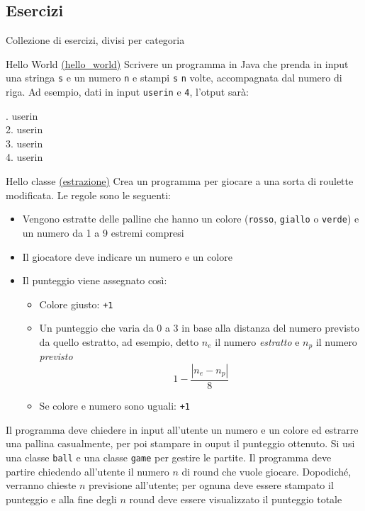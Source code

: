 \subsection{Esercizi}
Collezione di esercizi, divisi per categoria
\begin{esercizio}{Hello World \href{run:./files/java/esercizi/hello_world/}{(hello\_world)}}
	Scrivere un programma in Java che prenda in input una stringa \verb|s| e un numero \verb|n| e stampi \verb|s| \verb|n| volte, accompagnata dal numero di riga. Ad esempio, dati in input \verb|userin| e \verb|4|, l'otput sarà:
	\begin{center}
		. userin\\
		2. userin\\
		3. userin\\
		4. userin
	\end{center}
\end{esercizio}
\begin{esercizio}{Hello classe \href{run:./files/java/esercizi/estrazione/}{(estrazione)}}
	Crea un programma per giocare a una sorta di roulette modificata. Le regole sono le seguenti:
	\begin{itemize}
		\item Vengono estratte delle palline che hanno un colore (\verb|rosso|,  \verb|giallo| o \verb|verde|) e un numero da 1 a 9 estremi compresi
		\item Il giocatore deve indicare un numero e un colore
		\item Il punteggio viene assegnato così:
		      \begin{itemize}
			      \item Colore giusto: \verb|+1|
			      \item Un punteggio che varia da 0 a 3 in base alla distanza del numero previsto da quello estratto, ad esempio, detto $ n_e $ il numero \textit{estratto} e  $ n_p $ il numero \textit{previsto}
			            \[
				            1 - \frac{\left|n_e - n_p\right|}{8}
			            \]
			      \item Se colore e numero sono uguali: \verb|+1|
		      \end{itemize}
	\end{itemize}
	Il programma deve chiedere in input all'utente un numero e un colore ed estrarre una pallina casualmente, per poi stampare in ouput il punteggio ottenuto. Si usi una classe \verb|ball| e una classe \verb|game| per gestire le partite.
  \vskip3mm 
  Il programma deve partire chiedendo all'utente il numero $ n $ di round che vuole giocare. Dopodiché, verranno chieste $ n $ previsione all'utente; per ognuna deve essere stampato il punteggio e alla fine degli $ n $ round deve essere visualizzato il punteggio totale
\end{esercizio}





